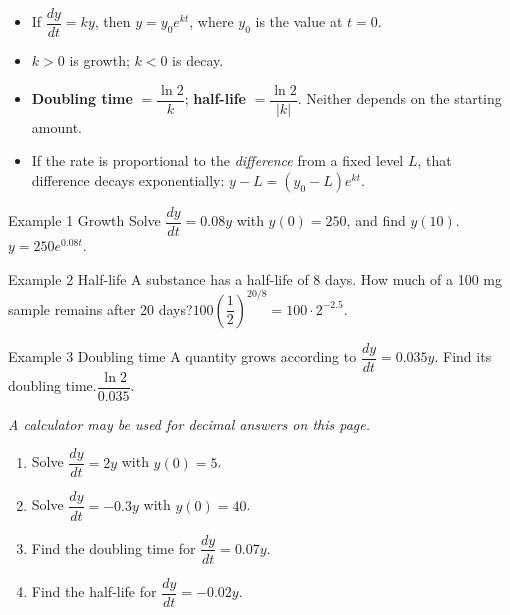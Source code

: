\documentclass[11pt]{article}
\begin{document}

\begin{ideabox}
\begin{itemize}[leftmargin=*,itemsep=2pt,topsep=2pt]
  \item If $\dfrac{dy}{dt}=ky$, then $y=y_0e^{kt}$, where $y_0$ is the value at $t=0$.
  \item $k>0$ is growth; $k<0$ is decay.
  \item \textbf{Doubling time} $=\dfrac{\ln2}{k}$; \textbf{half-life} $=\dfrac{\ln2}{|k|}$. Neither depends on the starting amount.
  \item If the rate is proportional to the \emph{difference} from a fixed level $L$, that difference decays exponentially: $y-L=(y_0-L)e^{kt}$.
\end{itemize}
\end{ideabox}

\begin{example}{Example 1 \textperiodcentered{} Growth}
Solve $\dfrac{dy}{dt}=0.08y$ with $y(0)=250$, and find $y(10)$.\soln $y=250e^{0.08t}$.
\end{example}

\begin{example}{Example 2 \textperiodcentered{} Half-life}
A substance has a half-life of 8 days. How much of a 100 mg sample remains after 20 days?\soln $100\left(\dfrac12\right)^{20/8}=100\cdot2^{-2.5}$.
\end{example}

\begin{example}{Example 3 \textperiodcentered{} Doubling time}
A quantity grows according to $\dfrac{dy}{dt}=0.035y$. Find its doubling time.\soln $\dfrac{\ln2}{0.035}$.
\end{example}

\newpage
{}
\emph{A calculator may be used for decimal answers on this page.}
\begin{enumerate}[leftmargin=*,itemsep=2pt]
  \item Solve $\dfrac{dy}{dt}=2y$ with $y(0)=5$.\work{2.3cm}
  \item Solve $\dfrac{dy}{dt}=-0.3y$ with $y(0)=40$.\work{2.3cm}
  \item Find the doubling time for $\dfrac{dy}{dt}=0.07y$.\work{2.3cm}
  \item Find the half-life for $\dfrac{dy}{dt}=-0.02y$.\work{2.3cm}
\end{enumerate}
\end{document}
